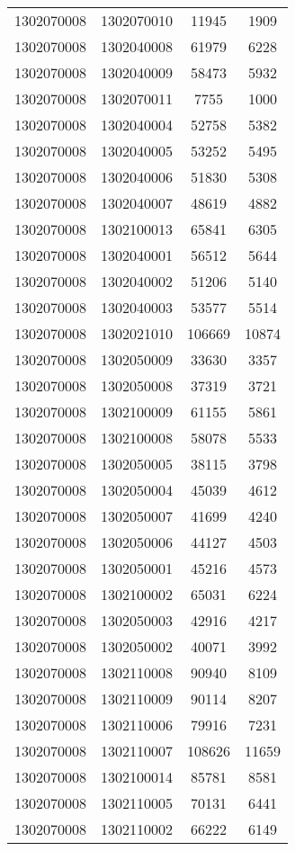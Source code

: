 \begin{longtable}[h]{llcc}
		1302070008 & 1302070010 & 11945 & 1909\\
		1302070008 & 1302040008 & 61979 & 6228\\
		1302070008 & 1302040009 & 58473 & 5932\\
		1302070008 & 1302070011 & 7755 & 1000\\
		1302070008 & 1302040004 & 52758 & 5382\\
		1302070008 & 1302040005 & 53252 & 5495\\
		1302070008 & 1302040006 & 51830 & 5308\\
		1302070008 & 1302040007 & 48619 & 4882\\
		1302070008 & 1302100013 & 65841 & 6305\\
		1302070008 & 1302040001 & 56512 & 5644\\
		1302070008 & 1302040002 & 51206 & 5140\\
		1302070008 & 1302040003 & 53577 & 5514\\
		1302070008 & 1302021010 & 106669 & 10874\\
		1302070008 & 1302050009 & 33630 & 3357\\
		1302070008 & 1302050008 & 37319 & 3721\\
		1302070008 & 1302100009 & 61155 & 5861\\
		1302070008 & 1302100008 & 58078 & 5533\\
		1302070008 & 1302050005 & 38115 & 3798\\
		1302070008 & 1302050004 & 45039 & 4612\\
		1302070008 & 1302050007 & 41699 & 4240\\
		1302070008 & 1302050006 & 44127 & 4503\\
		1302070008 & 1302050001 & 45216 & 4573\\
		1302070008 & 1302100002 & 65031 & 6224\\
		1302070008 & 1302050003 & 42916 & 4217\\
		1302070008 & 1302050002 & 40071 & 3992\\
		1302070008 & 1302110008 & 90940 & 8109\\
		1302070008 & 1302110009 & 90114 & 8207\\
		1302070008 & 1302110006 & 79916 & 7231\\
		1302070008 & 1302110007 & 108626 & 11659\\
		1302070008 & 1302100014 & 85781 & 8581\\
		1302070008 & 1302110005 & 70131 & 6441\\
		1302070008 & 1302110002 & 66222 & 6149\\

\end{longtable}
